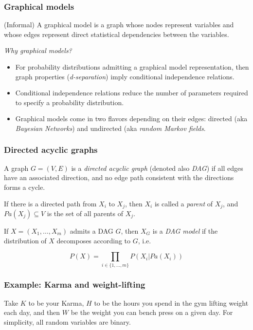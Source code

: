 \begin{frame}
\frametitle{Graphical models}
\begin{definition}
(Informal) A graphical model is a graph whose nodes represent variables and whose edges represent direct statistical dependencies between the variables.\newline
\end{definition}

\emph{Why graphical models?}
\begin{itemize}
\item For probability distributions admitting a graphical model representation, then graph properties (\emph{d-separation}) imply conditional independence relations.
\item Conditional independence relations reduce the number of parameters required to specify a probability distribution.
\item Graphical models come in two flavors depending on their edges: directed (aka \emph{Bayesian Networks}) and undirected (aka \emph{random Markov fields}.
\end{itemize}
\end{frame}


\begin{frame}
\frametitle{Directed acyclic graphs}

\begin{definition}
A graph $G = (V, E)$ is a \emph{directed acyclic graph} (denoted also \emph{DAG}) if all edges have an associated direction, and no edge path consistent with the directions forms a cycle.\newline

If there is a directed path from $X_i$ to $X_j$, then $X_i$ is called a \emph{parent} of $X_j$, and $Pa(X_j) \subseteq V$ is the set of all parents of $X_j$.
\end{definition}

\begin{definition}
  If $X = (X_1, \ldots, X_m)$ admits a DAG $G$, then $X_G$ is a \emph{DAG model} if the distribution of $X$ decomposes according to $G$, i.e.

  \begin{equation*}
    P(X) = \prod_{i \in \{1, \ldots, m\}} P(X_i | Pa(X_i))
  \end{equation*}
\end{definition}
\end{frame}


\begin{frame}
  \frametitle{Example: Karma and weight-lifting}
  Take $K$ to be your Karma, $H$ to be the hours you spend in the gym lifting weight each day, and then $W$ be the weight you can bench press on a given day. For simplicity, all random variables are binary.\newline
  
  \newline
  \end{frame}
  

